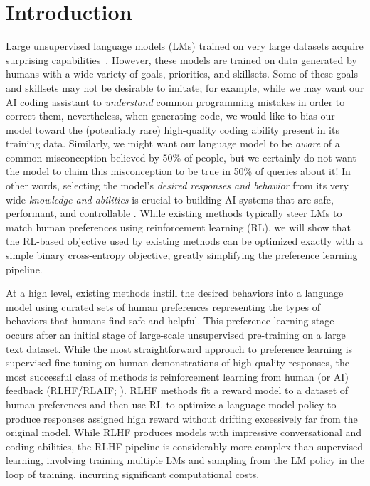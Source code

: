 \section{Introduction}
Large unsupervised language models (LMs) trained on very large datasets acquire surprising capabilities~\citep{chowdhery2022palm, brown2020language, touvron2023llama,bubeck2023sparks}. However, these models are trained on data generated by humans with a wide variety of goals, priorities, and skillsets. Some of these goals and skillsets may not be desirable to imitate; for example, while we may want our AI coding assistant to \textit{understand} common programming mistakes in order to correct them, nevertheless, when generating code, we would like to bias our model toward the (potentially rare) high-quality coding ability present in its training data. Similarly, we might want our language model to be \textit{aware} of a common misconception believed by 50\% of people, but we certainly do not want the model to claim this misconception to be true in 50\% of queries about it! In other words, selecting the model's \emph{desired responses and behavior} from its very wide \textit{knowledge and abilities} is crucial to building AI systems that are safe, performant, and controllable \citep{ouyang2022training}. While existing methods typically steer LMs to match human preferences using reinforcement learning (RL), we will show that the RL-based objective used by existing methods can be optimized exactly with a simple binary cross-entropy objective, greatly simplifying the preference learning pipeline.

At a high level, existing methods instill the desired behaviors into a language model using curated sets of human preferences representing the types of behaviors that humans find safe and helpful. This preference learning stage occurs after an initial stage of large-scale unsupervised pre-training on a large text dataset. While the most straightforward approach to preference learning is supervised fine-tuning on human demonstrations of high quality responses, the most successful class of methods is reinforcement learning from human (or AI) feedback (RLHF/RLAIF; \citep{christiano2017deep,bai2022constitutional}). RLHF methods fit a reward model to a dataset of human preferences and then use RL to optimize a language model policy to produce responses assigned high reward without drifting excessively far from the original model. While RLHF produces models with impressive conversational and coding abilities, the RLHF pipeline is considerably more complex than supervised learning, involving training multiple LMs and sampling from the LM policy in the loop of training, incurring significant computational costs.


